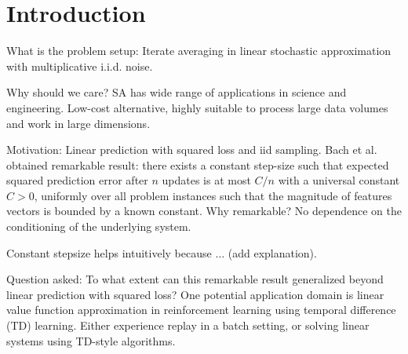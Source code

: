 \section{Introduction}
What is the problem setup:
Iterate averaging in linear stochastic approximation with multiplicative i.i.d. noise.

Why should we care?
SA has wide range of applications in science and engineering. Low-cost alternative,
highly suitable to process large data volumes and work in large dimensions.

Motivation: Linear prediction with squared loss and iid sampling. Bach et al. obtained remarkable result:
there exists a constant step-size 
such that expected squared prediction error
after $n$ updates is at most $C/n$ with a universal constant $C>0$, 
uniformly over all problem instances
such that the magnitude of features vectors is bounded by a known constant.
Why remarkable? No dependence on the conditioning of the underlying system.

Constant stepsize helps intuitively because $\dots$ (add explanation).

Question asked: To what extent can this remarkable result generalized beyond linear prediction 
with squared loss?
One potential application domain is
linear value function approximation in reinforcement learning using temporal difference (TD) learning.
Either experience replay in a batch setting, or solving linear systems using TD-style algorithms.